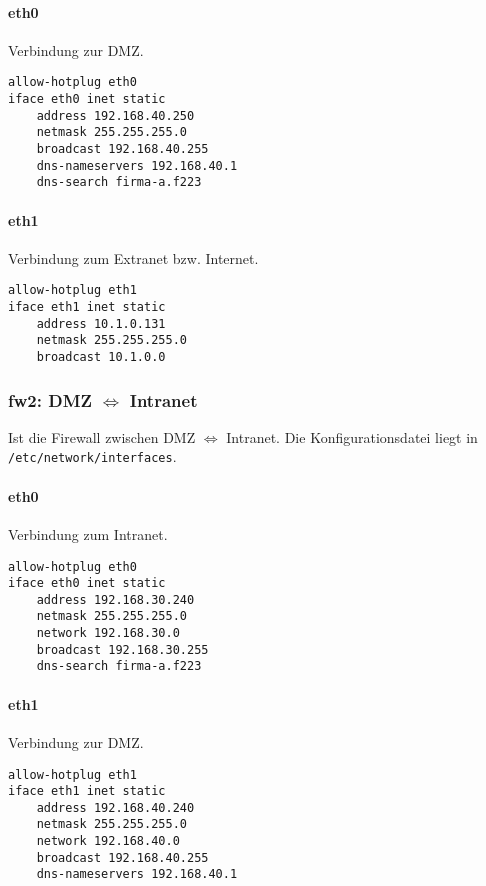 \paragraph{eth0} Verbindung zur DMZ.

\begin{lstlisting}[label=lst:dmz:eth0,caption={Netzwerkadapter eth0 Konfiguration.}]
allow-hotplug eth0
iface eth0 inet static
    address 192.168.40.250
    netmask 255.255.255.0
    broadcast 192.168.40.255
    dns-nameservers 192.168.40.1
    dns-search firma-a.f223
\end{lstlisting}

\paragraph{eth1} Verbindung zum Extranet bzw. Internet.

\begin{lstlisting}[label=lst:extranet:eth1,caption={Netzwerkadapter eth1 Konfiguration.}]
allow-hotplug eth1
iface eth1 inet static
    address 10.1.0.131
    netmask 255.255.255.0
    broadcast 10.1.0.0
\end{lstlisting}


\subsubsection{fw2: DMZ $\Longleftrightarrow$ Intranet}

Ist die Firewall zwischen DMZ $\Longleftrightarrow$ Intranet.
Die Konfigurationsdatei liegt in {\tt /etc/network/interfaces}.

\paragraph{eth0} Verbindung zum Intranet.

\begin{lstlisting}[label=lst:dmz:eth0,caption={Netzwerkadapter eth0 Konfiguration.}]
allow-hotplug eth0
iface eth0 inet static
    address 192.168.30.240
    netmask 255.255.255.0
    network 192.168.30.0
    broadcast 192.168.30.255
    dns-search firma-a.f223
\end{lstlisting}

\paragraph{eth1} Verbindung zur DMZ.

\begin{lstlisting}[label=lst:extranet:eth1,caption={Netzwerkadapter eth1 Konfiguration.}]
allow-hotplug eth1
iface eth1 inet static
    address 192.168.40.240
    netmask 255.255.255.0
    network 192.168.40.0
    broadcast 192.168.40.255
    dns-nameservers 192.168.40.1
\end{lstlisting}


